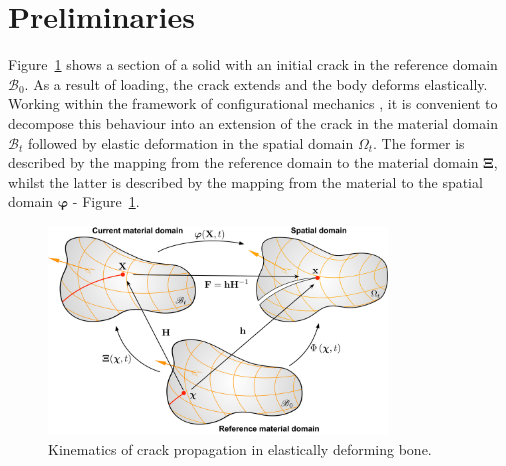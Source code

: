 \documentclass[onecolumn]{svjour3}
\begin{document}
% 
% 
\section{Preliminaries}
\label{preliminaries}
Figure~\ref{fig:domains4} shows a section of a solid with an initial crack in the reference domain $\mathscr{B}_{0}$. As a result of loading, the crack extends and the body deforms elastically. Working within the framework of configurational mechanics \cite{kaczmarczyk2014three,kienzler2014configurational}, it is convenient to decompose this behaviour into an extension of the crack in the material domain  $\mathscr{B}_t$ followed by elastic deformation in the spatial domain $\Omega_t$. The former is described by the mapping from the reference  domain to the material domain ${\boldsymbol\Xi}$, whilst the latter is described by the mapping from the material to the spatial domain ${\boldsymbol\varphi}$ - Figure~\ref{fig:domains4}.

\begin{figure}[th] 
\setlength{\fboxsep}{0pt}%
\setlength{\fboxrule}{0pt}%
\begin{center}
\includegraphics[width=9cm]{Figures/domains5.pdf} 
\end{center}
\caption{Kinematics of crack propagation in elastically deforming bone.}
\label{fig:domains4}
\end{figure}
\end{document}
